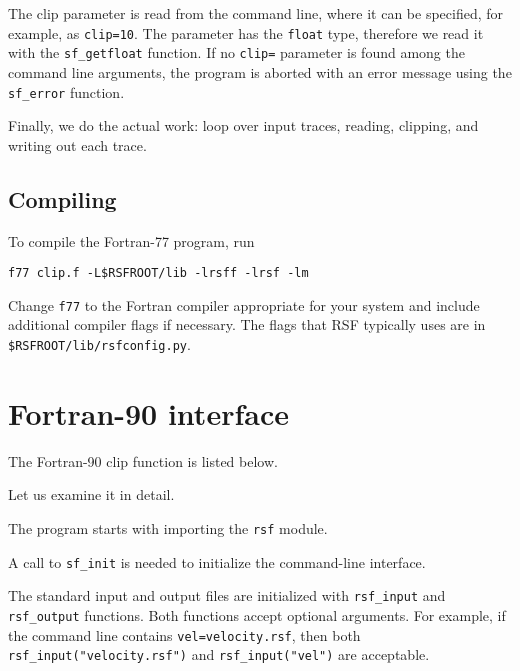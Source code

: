 
The clip parameter is read from the command line, where it can be
specified, for example, as \texttt{clip=10}. The parameter has the
\texttt{float} type, therefore we read it with the
\texttt{sf\_getfloat} function. If no \texttt{clip=} parameter is
found among the command line arguments, the program is aborted with an
error message using the \texttt{sf\_error} function.


Finally, we do the actual work: loop over input traces, reading,
clipping, and writing out each trace.

\subsection{Compiling}

To compile the Fortran-77 program, run
\begin{verbatim}
f77 clip.f -L$RSFROOT/lib -lrsff -lrsf -lm
\end{verbatim}
Change \texttt{f77} to the Fortran compiler appropriate for your system and
include additional compiler flags if necessary. The flags that RSF typically
uses are in \texttt{\$RSFROOT/lib/rsfconfig.py}.

\section{Fortran-90 interface}

\lstset{language=fortran}

The Fortran-90 clip function is listed below.



Let us examine it in detail.


The program starts with importing the \texttt{rsf} module.


A call to \texttt{sf\_init} is needed to initialize the command-line
interface.


The standard input and output files are initialized with
\texttt{rsf\_input} and \texttt{rsf\_output} functions. Both functions
accept optional arguments. For example, if the command line contains
\texttt{vel=velocity.rsf}, then both
\texttt{rsf\_input("velocity.rsf")} and \texttt{rsf\_input("vel")} are
acceptable.

